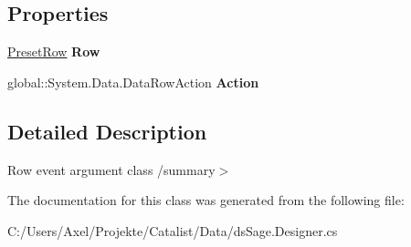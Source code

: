 \subsection*{Properties}
\begin{DoxyCompactItemize}
\item 
\hyperlink{class_products_1_1_data_1_1ds_sage_1_1_preset_row}{Preset\+Row} {\bfseries Row}\hypertarget{class_products_1_1_data_1_1ds_sage_1_1_preset_row_change_event_ae9a7e65a1f0efd325ffcc5db6328fda3}{}\label{class_products_1_1_data_1_1ds_sage_1_1_preset_row_change_event_ae9a7e65a1f0efd325ffcc5db6328fda3}

\item 
global\+::\+System.\+Data.\+Data\+Row\+Action {\bfseries Action}\hypertarget{class_products_1_1_data_1_1ds_sage_1_1_preset_row_change_event_a871f29e25d9c97fa0b41813275f5b5aa}{}\label{class_products_1_1_data_1_1ds_sage_1_1_preset_row_change_event_a871f29e25d9c97fa0b41813275f5b5aa}

\end{DoxyCompactItemize}


\subsection{Detailed Description}
Row event argument class /summary$>$ 

The documentation for this class was generated from the following file\+:\begin{DoxyCompactItemize}
\item 
C\+:/\+Users/\+Axel/\+Projekte/\+Catalist/\+Data/ds\+Sage.\+Designer.\+cs\end{DoxyCompactItemize}
